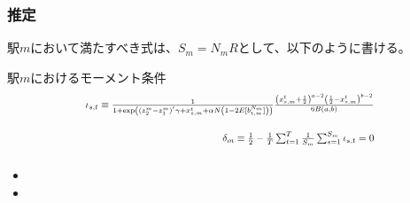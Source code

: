 \documentclass[dvipdfmx, 12pt]{beamer}
\begin{document}
\begin{frame}\frametitle{推定}
	駅$m$において満たすべき式は、$S_m = N_m R$として、以下のように書ける。
	
	\begin{itembox}[l]{駅$m$におけるモーメント条件}
	\begin{align*}
	\scalebox{0.8}{$
	\iota_{s, t} \equiv \frac{1}{1 + \exp\left( (z_2^m - z_1^m)^{'}\gamma + x_{s,m}^t + \alpha N \left(1 - 2E[b_{t,m}^{N_m}]\right) \right)} \frac{\left(x_{s,m}^t + \frac{1}{2}\right)^{a - 2} \left(\frac{1}{2} - x_{s,m}^t \right)^{b-2}}{6B(a, b)}$}\\[8pt]
	\scalebox{0.8}{$
	\delta_m \equiv \frac{1}{2} - \frac{1}{T}\sum_{t = 1}^T \frac{1}{S_m}\sum_{s = 1}^{S_m} \iota_{s, t} = 0
	$}
	\end{align*}
	\end{itembox}
\end{frame}

\begin{frame}\frametitle{}
	\begin{itemize}
		\item 
		\item 
	\end{itemize}
\end{frame}
\end{document}
